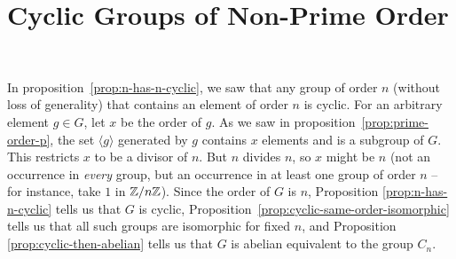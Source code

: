 \section{Cyclic Groups of Non-Prime Order}~\label{sec:cyclic-non-prime}

In proposition~\ref{prop:n-has-n-cyclic}, we saw that any group of order $n$
(without loss of generality)
that contains an element of order $n$ is cyclic.
For an arbitrary element $g \in G$, let $x$ be the order of $g$.
As we saw in proposition~\ref{prop:prime-order-p},
the set $\langle g \rangle$ generated by $g$ contains $x$ elements
and is a subgroup of $G$.
This restricts $x$ to be a divisor of $n$.
But $n$ divides $n$, so $x$ might be $n$
(not an occurrence in \emph{every} group,
but an occurrence in at least one group of order $n$ -- for instance,
take $1$ in $\mathbb{Z}/n\mathbb{Z}$).
Since the order of $G$ is $n$, Proposition \ref{prop:n-has-n-cyclic} tells us
that $G$ is cyclic, Proposition~\ref{prop:cyclic-same-order-isomorphic}
tells us that all such groups are isomorphic for fixed $n$,
and Proposition \ref{prop:cyclic-then-abelian} tells us that
$G$ is abelian equivalent to the group $C_n$.

